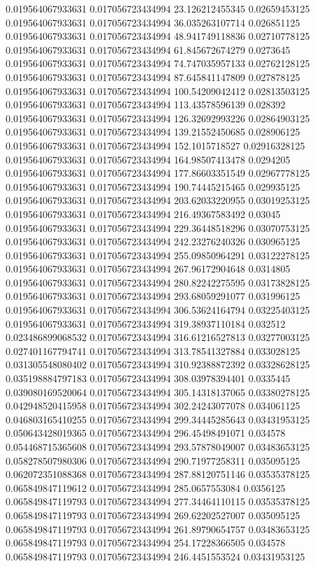 0.019564067933631 0.017056723434994 23.126212455345 0.02659453125
0.019564067933631 0.017056723434994 36.035263107714 0.026851125
0.019564067933631 0.017056723434994 48.941749118836 0.02710778125
0.019564067933631 0.017056723434994 61.845672674279 0.0273645
0.019564067933631 0.017056723434994 74.747035957133 0.02762128125
0.019564067933631 0.017056723434994 87.645841147809 0.027878125
0.019564067933631 0.017056723434994 100.54209042412 0.02813503125
0.019564067933631 0.017056723434994 113.43578596139 0.028392
0.019564067933631 0.017056723434994 126.32692993226 0.02864903125
0.019564067933631 0.017056723434994 139.21552450685 0.028906125
0.019564067933631 0.017056723434994 152.1015718527 0.02916328125
0.019564067933631 0.017056723434994 164.98507413478 0.0294205
0.019564067933631 0.017056723434994 177.86603351549 0.02967778125
0.019564067933631 0.017056723434994 190.74445215465 0.029935125
0.019564067933631 0.017056723434994 203.62033220955 0.03019253125
0.019564067933631 0.017056723434994 216.49367583492 0.03045
0.019564067933631 0.017056723434994 229.36448518296 0.03070753125
0.019564067933631 0.017056723434994 242.23276240326 0.030965125
0.019564067933631 0.017056723434994 255.09850964291 0.03122278125
0.019564067933631 0.017056723434994 267.96172904648 0.0314805
0.019564067933631 0.017056723434994 280.82242275595 0.03173828125
0.019564067933631 0.017056723434994 293.68059291077 0.031996125
0.019564067933631 0.017056723434994 306.53624164794 0.03225403125
0.019564067933631 0.017056723434994 319.38937110184 0.032512
0.023486899068532 0.017056723434994 316.61216527813 0.03277003125
0.027401167794741 0.017056723434994 313.78541327884 0.033028125
0.031305548080402 0.017056723434994 310.92388872392 0.03328628125
0.035198884797183 0.017056723434994 308.03978394401 0.0335445
0.039080169520064 0.017056723434994 305.14318137065 0.03380278125
0.042948520415958 0.017056723434994 302.24243077078 0.034061125
0.046803165410255 0.017056723434994 299.34445285643 0.03431953125
0.050643428019365 0.017056723434994 296.45498491071 0.034578
0.054468715365608 0.017056723434994 293.57878049007 0.03483653125
0.058278507980306 0.017056723434994 290.71977258311 0.035095125
0.062072351088368 0.017056723434994 287.88120751146 0.03535378125
0.065849847119612 0.017056723434994 285.0657553084 0.0356125
0.065849847119793 0.017056723434994 277.34464110115 0.03535378125
0.065849847119793 0.017056723434994 269.62202527007 0.035095125
0.065849847119793 0.017056723434994 261.89790654757 0.03483653125
0.065849847119793 0.017056723434994 254.17228366505 0.034578
0.065849847119793 0.017056723434994 246.4451553524 0.03431953125
